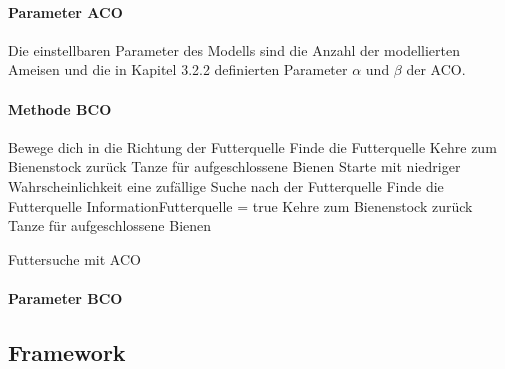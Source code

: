 \documentclass[a4paper, 11pt]{article}
\begin{document}
\paragraph{Parameter \acs{ACO}}
Die einstellbaren Parameter des Modells sind die Anzahl der modellierten Ameisen und die in Kapitel 3.2.2 definierten Parameter $\alpha$ und $\beta$ der \acs{ACO}.
\paragraph{Methode \acs{BCO}}

\begin{framed}
	\begin{algorithm}[H]
		{
			Bewege dich in die Richtung der Futterquelle\;
			Finde die Futterquelle\;
			Kehre zum Bienenstock zurück\;
			Tanze für aufgeschlossene Bienen\;
		}
		{
			{
				Starte mit niedriger Wahrscheinlichkeit eine zufällige Suche nach der Futterquelle\;
				{
					Finde die Futterquelle\;
					InformationFutterquelle = true\;
					Kehre zum Bienenstock zurück\;
					Tanze für aufgeschlossene Bienen\;					
				}	
			}
		}
		\caption{Futtersuche mit \acs{ACO}}
		\label{futtersuchebco}
	\end{algorithm}
\end{framed}
\paragraph{Parameter \acs{BCO}}

\newpage
\subsection{Framework}
\end{document}
